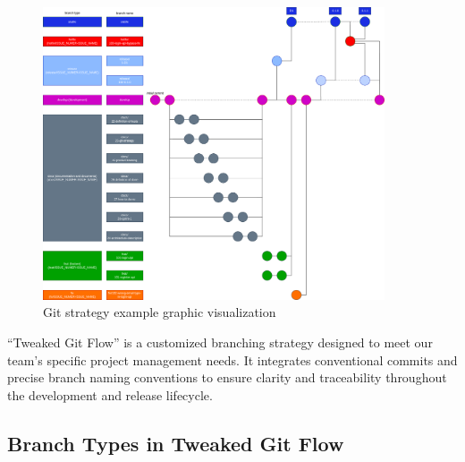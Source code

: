 \begin{figure}[h]
	\centering
	\includegraphics[width=0.9\textwidth]{images/git-strategy.png}
	\caption{Git strategy example graphic visualization}
\end{figure}

``Tweaked Git Flow'' is a customized branching strategy designed to meet our team's specific project management needs. It integrates conventional commits and precise branch naming conventions to ensure clarity and traceability throughout the development and release lifecycle.

\subsection{Branch Types in Tweaked Git Flow}

